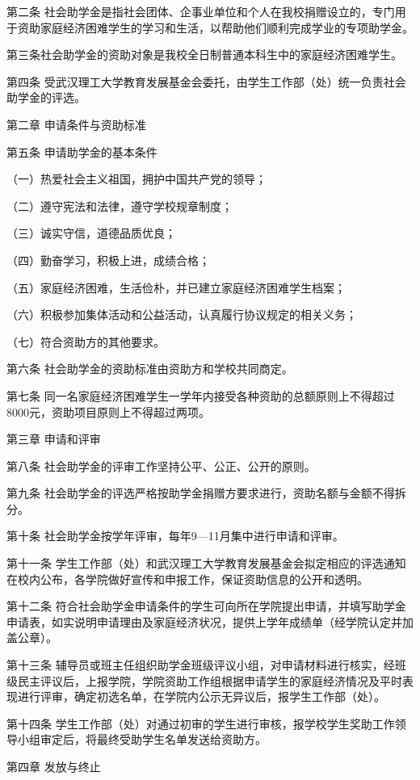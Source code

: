 \documentclass[UTF8,12pt,a4paper]{report}
\begin{document}
第二条 社会助学金是指社会团体、企事业单位和个人在我校捐赠设立的，专门用于资助家庭经济困难学生的学习和生活，以帮助他们顺利完成学业的专项助学金。

第三条社会助学金的资助对象是我校全日制普通本科生中的家庭经济困难学生。

第四条 受武汉理工大学教育发展基金会委托，由学生工作部（处）统一负责社会助学金的评选。

第二章 申请条件与资助标准

第五条 申请助学金的基本条件

（一）热爱社会主义祖国，拥护中国共产党的领导；

（二）遵守宪法和法律，遵守学校规章制度；

（三）诚实守信，道德品质优良；

（四）勤奋学习，积极上进，成绩合格；

（五）家庭经济困难，生活俭朴，并已建立家庭经济困难学生档案；

（六）积极参加集体活动和公益活动，认真履行协议规定的相关义务；

（七）符合资助方的其他要求。

第六条 社会助学金的资助标准由资助方和学校共同商定。

第七条 同一名家庭经济困难学生一学年内接受各种资助的总额原则上不得超过8000元，资助项目原则上不得超过两项。

第三章 申请和评审

第八条 社会助学金的评审工作坚持公平、公正、公开的原则。

第九条 社会助学金的评选严格按助学金捐赠方要求进行，资助名额与金额不得拆分。

第十条 社会助学金按学年评审，每年9—11月集中进行申请和评审。

第十一条 学生工作部（处）和武汉理工大学教育发展基金会拟定相应的评选通知在校内公布，各学院做好宣传和申报工作，保证资助信息的公开和透明。

第十二条 符合社会助学金申请条件的学生可向所在学院提出申请，并填写助学金申请表，如实说明申请理由及家庭经济状况，提供上学年成绩单（经学院认定并加盖公章）。

第十三条 辅导员或班主任组织助学金班级评议小组，对申请材料进行核实，经班级民主评议后，上报学院，学院资助工作组根据申请学生的家庭经济情况及平时表现进行评审，确定初选名单，在学院内公示无异议后，报学生工作部（处）。

第十四条 学生工作部（处）对通过初审的学生进行审核，报学校学生奖助工作领导小组审定后，将最终受助学生名单发送给资助方。

第四章 发放与终止
\end{document}
